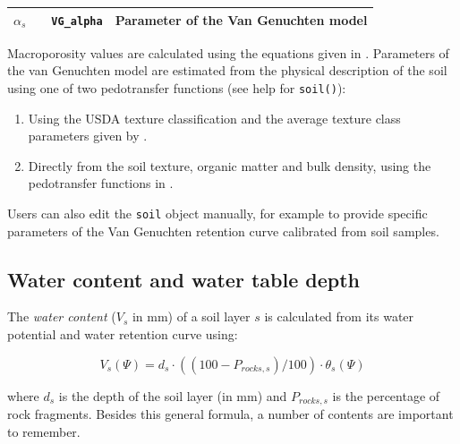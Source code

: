 \documentclass[]{book}
\providecommand{\tightlist}{%
  \setlength{\itemsep}{0pt}\setlength{\parskip}{0pt}}
\begin{document}
\begin{longtable}[]{@{}llll@{}}
\begin{minipage}[t]{0.11\columnwidth}\raggedright\strut
\(\alpha_s\)\strut
\end{minipage} & \begin{minipage}[t]{0.10\columnwidth}\raggedright\strut
\strut
\end{minipage} & \begin{minipage}[t]{0.06\columnwidth}\raggedright\strut
\texttt{VG\_alpha}\strut
\end{minipage} & \begin{minipage}[t]{0.53\columnwidth}\raggedright\strut
Parameter of the Van Genuchten \citeyearpar{Genuchten1980} model\strut
\end{minipage}\tabularnewline
\bottomrule
\end{longtable}

Macroporosity values are calculated using the equations given in
\citet{Stolf2011}. Parameters of the van Genuchten model are estimated
from the physical description of the soil using one of two pedotransfer
functions (see help for \texttt{soil()}):

\begin{enumerate}
\def\labelenumi{\arabic{enumi}.}
\tightlist
\item
  Using the USDA texture classification and the average texture class
  parameters given by \citet{Carsel1988}.
\item
  Directly from the soil texture, organic matter and bulk density, using
  the pedotransfer functions in \citet{Toth2015}.
\end{enumerate}

Users can also edit the \texttt{soil} object manually, for example to
provide specific parameters of the Van Genuchten retention curve
calibrated from soil samples.

\subsection{Water content and water table
depth}\label{water-content-and-water-table-depth}

The \emph{water content} (\(V_s\) in mm) of a soil layer \(s\) is
calculated from its water potential and water retention curve using:

\begin{equation}
V_s(\Psi) = d_s\cdot ((100-P_{rocks,s})/100)\cdot\theta_{s}(\Psi)
\end{equation}

where \(d_s\) is the depth of the soil layer (in mm) and \(P_{rocks,s}\)
is the percentage of rock fragments. Besides this general formula, a
number of contents are important to remember.
\end{document}
